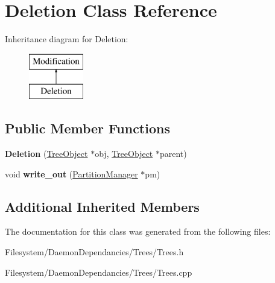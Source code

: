 \hypertarget{classDeletion}{}\section{Deletion Class Reference}
\label{classDeletion}
Inheritance diagram for Deletion\+:\begin{figure}[H]
\begin{center}
\leavevmode
\includegraphics[height=2.000000cm]{d2/df0/classDeletion}
\end{center}
\end{figure}
\subsection*{Public Member Functions}
\begin{DoxyCompactItemize}
\item 
\mbox{\label{classDeletion_a8446318e3f7004ef557b6021350fa389}} 
{\bfseries Deletion} (\mbox{\hyperlink{classTreeObject}{Tree\+Object}} $\ast$obj, \mbox{\hyperlink{classTreeObject}{Tree\+Object}} $\ast$parent)
\item 
\mbox{\label{classDeletion_ac5bdb21c4a8dbc8afea9910435e509a8}} 
void {\bfseries write\+\_\+out} (\mbox{\hyperlink{classPartitionManager}{Partition\+Manager}} $\ast$pm)
\end{DoxyCompactItemize}
\subsection*{Additional Inherited Members}


The documentation for this class was generated from the following files\+:\begin{DoxyCompactItemize}
\item 
Filesystem/\+Daemon\+Dependancies/\+Trees/Trees.\+h\item 
Filesystem/\+Daemon\+Dependancies/\+Trees/Trees.\+cpp\end{DoxyCompactItemize}
